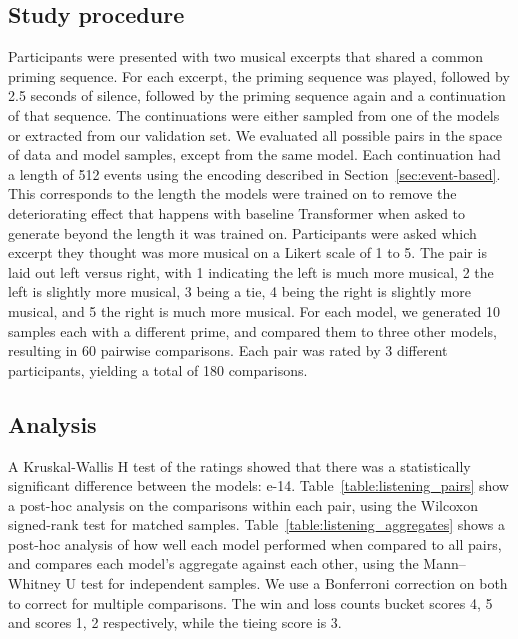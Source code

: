 \documentclass{article} \usepackage{iclr2019_conference,times}
\begin{document}
\subsection{Study procedure}
Participants were presented with two musical excerpts that shared a common priming sequence. For each excerpt, the priming sequence was played, followed by 2.5 seconds of silence, followed by the priming sequence again and a continuation of that sequence. The continuations were either sampled from one of the models or extracted from our validation set.   We evaluated all possible pairs in the space of data and model samples, except from the same model. 
Each continuation had a length of 512 events using the encoding described in Section~\ref{sec:event-based}.  This corresponds to the length the models were trained on to remove the deteriorating effect that happens with baseline Transformer when asked to generate beyond the length it was trained on.  
Participants were asked which excerpt they thought was more musical on a Likert scale of 1 to 5.  The pair is laid out left versus right, with 1 indicating the left is much more musical, 2 the left is slightly more musical, 3 being a tie, 4 being the right is slightly more musical, and 5 the right is much more musical. 
For each model, we generated 10 samples each with a different prime, and compared them to three other models, resulting in 60 pairwise comparisons.  Each pair was rated by 3 different participants, yielding a total of 180 comparisons. 



















\subsection{Analysis}
\label{sec:listening_analysis}
A Kruskal-Wallis H test of the ratings showed that there was a statistically significant difference between the models: e-14. 
Table~\ref{table:listening_pairs} show a post-hoc analysis on the comparisons within each pair, using the Wilcoxon signed-rank test for matched samples.  
Table~\ref{table:listening_aggregates} shows a post-hoc analysis of how well each model performed when compared to all pairs, and compares each model's aggregate against each other, using the Mann–Whitney U test for independent samples.  We use a Bonferroni correction on both to correct for multiple comparisons.
The win and loss counts bucket scores 4, 5 and scores 1, 2 respectively, while the tieing score is 3.
\end{document}
